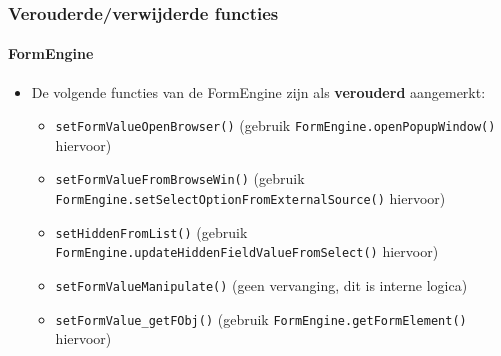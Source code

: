 \begin{frame}[fragile]
	\frametitle{Verouderde/verwijderde functies}
	\framesubtitle{FormEngine}

	\lstset{basicstyle=\tiny\ttfamily}

	\begin{itemize}
		\item De volgende functies van de FormEngine zijn als \textbf{verouderd} aangemerkt:

			\begin{itemize}
				\item \texttt{setFormValueOpenBrowser()}\newline
					\smaller(gebruik \texttt{FormEngine.openPopupWindow()} hiervoor)\small

				\item \texttt{setFormValueFromBrowseWin()}\newline
					\smaller(gebruik \texttt{FormEngine.setSelectOptionFromExternalSource()} hiervoor)\small

				\item \texttt{setHiddenFromList()}\newline
					\smaller(gebruik \texttt{FormEngine.updateHiddenFieldValueFromSelect()} hiervoor)\small

				\item \texttt{setFormValueManipulate()}\newline
					\smaller(geen vervanging, dit is interne logica)\small

				\item \texttt{setFormValue\_getFObj()}\newline
					\smaller(gebruik \texttt{FormEngine.getFormElement()} hiervoor)\small

			\end{itemize}

	\end{itemize}

\end{frame}


